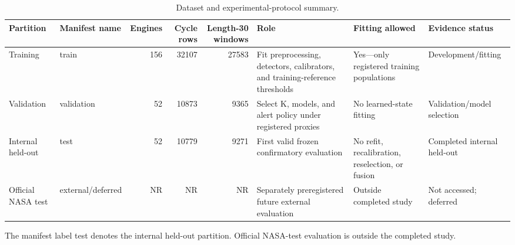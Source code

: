 \begin{table}[t]
\centering
\small
\caption{Dataset and experimental-protocol summary.}
\label{tab:dataset-protocol}
\begin{tabular}{p{}p{}r r r p{}p{}p{}}
\hline
Partition & Manifest name & Engines & Cycle rows & Length-30 windows & Role & Fitting allowed & Evidence status \\
\hline
Training & train & 156 & 32107 & 27583 & Fit preprocessing, detectors, calibrators, and training-reference thresholds & Yes---only registered training populations & Development/fitting \\
Validation & validation & 52 & 10873 & 9365 & Select K, models, and alert policy under registered proxies & No learned-state fitting & Validation/model selection \\
Internal held-out & test & 52 & 10779 & 9271 & First valid frozen confirmatory evaluation & No refit, recalibration, reselection, or fusion & Completed internal held-out \\
Official NASA test & external/deferred & NR & NR & NR & Separately preregistered future external evaluation & Outside completed study & Not accessed; deferred \\
\hline
\end{tabular}
\vspace{0.5ex}
\parbox{0.98\textwidth}{\footnotesize The manifest label test denotes the internal held-out partition. Official NASA-test evaluation is outside the completed study.}
\end{table}
